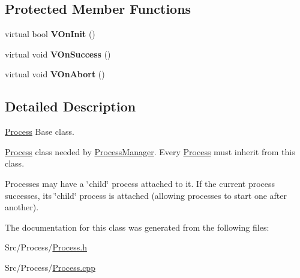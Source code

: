 \subsection*{Protected Member Functions}
\begin{DoxyCompactItemize}
\item 
\hypertarget{classProcess_a90628278bebb912c92bc0eb66bf5b4c0}{virtual bool {\bfseries V\-On\-Init} ()}\label{classProcess_a90628278bebb912c92bc0eb66bf5b4c0}

\item 
\hypertarget{classProcess_ae0dd19c4e48b16affc7ba3a466b907d5}{virtual void {\bfseries V\-On\-Success} ()}\label{classProcess_ae0dd19c4e48b16affc7ba3a466b907d5}

\item 
\hypertarget{classProcess_ac258942f24dfa613ad5ede2225cfe191}{virtual void {\bfseries V\-On\-Abort} ()}\label{classProcess_ac258942f24dfa613ad5ede2225cfe191}

\end{DoxyCompactItemize}


\subsection{Detailed Description}
\hyperlink{classProcess}{Process} Base class. 

\hyperlink{classProcess}{Process} class needed by \hyperlink{classProcessManager}{Process\-Manager}. Every \hyperlink{classProcess}{Process} must inherit from this class.

Processes may have a \char`\"{}child\char`\"{} process attached to it. If the current process successes, its \char`\"{}child\char`\"{} process is attached (allowing processes to start one after another). 

The documentation for this class was generated from the following files\-:\begin{DoxyCompactItemize}
\item 
Src/\-Process/\hyperlink{Process_8h}{Process.\-h}\item 
Src/\-Process/\hyperlink{Process_8cpp}{Process.\-cpp}\end{DoxyCompactItemize}

